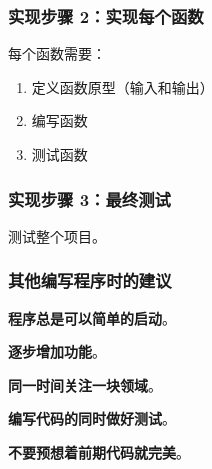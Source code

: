 \documentclass[../../LearnCpp.tex]{subfiles}
\begin{document}
\subsubsection*{实现步骤 2：实现每个函数}

每个函数需要：

\begin{enumerate}
    \item 定义函数原型（输入和输出）
    \item 编写函数
    \item 测试函数
\end{enumerate}

\subsubsection*{实现步骤 3：最终测试}

测试整个项目。

\subsubsection*{其他编写程序时的建议}

\textbf{程序总是可以简单的启动}。

\textbf{逐步增加功能}。

\textbf{同一时间关注一块领域}。

\textbf{编写代码的同时做好测试}。

\textbf{不要预想着前期代码就完美}。
\end{document}
